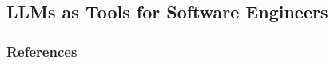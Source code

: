 



\subsection{LLMs as Tools for Software Engineers}
\label{sec:llms-as-tools-for-software-engineers}



\subsubsection{References}





